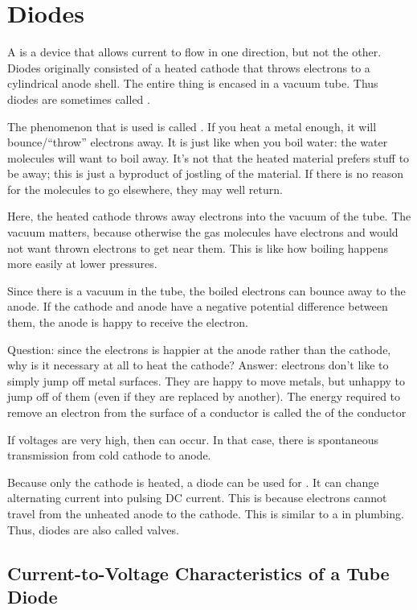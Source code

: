 \documentclass[11pt, oneside]{amsart}
\begin{document}
\section{Diodes}

A  is a device that allows current to flow in one
direction, but not the other. Diodes originally consisted of a heated
cathode that throws electrons to a cylindrical anode shell. The entire
thing is encased in a vacuum tube. Thus diodes are sometimes called
.

The phenomenon that is used is called . If
you heat a metal enough, it will bounce/``throw'' electrons away. It is
just like when you boil water: the water molecules will want to boil
away. It's not that the heated material prefers stuff to be away; this
is just a byproduct of jostling of the material. If there is no reason
for the molecules to go elsewhere, they may well return.

Here, the heated cathode throws away electrons into the vacuum of the
tube. The vacuum matters, because otherwise the gas molecules have
electrons and would not want thrown electrons to get near them. This is
like how boiling happens more easily at lower pressures.

Since there is a vacuum in the tube, the boiled electrons can bounce
away to the anode. If the cathode and anode have a negative potential
difference between them, the anode is happy to receive the electron.

Question: since the electrons is happier at the anode rather than the
cathode, why is it necessary at all to heat the cathode? Answer:
electrons don't like to simply jump off metal surfaces. They are happy
to move  metals, but unhappy to jump off of them (even
if they are replaced by another). The energy required to remove an
electron from the surface of a conductor is called the  of the conductor

If voltages are very high, then  can
occur. In that case, there is spontaneous transmission from cold cathode
to anode.

Because only the cathode is heated, a diode can be used for
. It can change alternating current into pulsing
DC current. This is because electrons cannot travel from the unheated
anode to the cathode. This is similar to a  in plumbing.
Thus, diodes are also called valves.

\subsection{Current-to-Voltage Characteristics of a Tube Diode}
\end{document}
